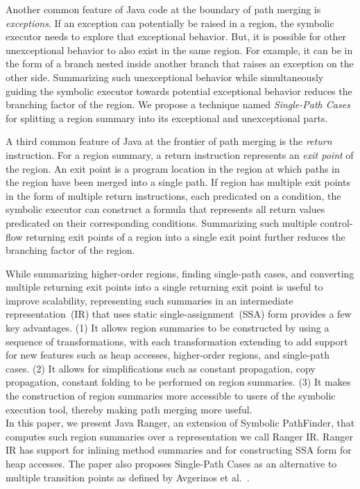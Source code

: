 Another common feature of Java code at the boundary of path merging is \textit{exceptions}.
%
If an exception can potentially be raised in a region, the symbolic executor needs to explore that exceptional behavior.
%
But, it is possible for other unexceptional behavior to also exist in the same region.
%
For example, it can be in the form of a branch nested inside another branch that raises an exception on the other side.
%
Summarizing such unexceptional behavior while simultaneously guiding the symbolic executor towards potential exceptional
behavior reduces the branching factor of the region.
%
We propose a technique named \textit{Single-Path Cases} for splitting a region summary into its exceptional and
unexceptional parts.

A third common feature of Java at the frontier of path merging is the \textit{return} instruction.
%
For a region summary, a return instruction represents an \textit{exit point} of the region.
%
An exit point is a program location in the region at which paths in the region have been merged into a single path.
%
If region has multiple exit points in the form of multiple return instructions, each predicated on a condition, the symbolic
executor can construct a formula that represents all return values predicated on their corresponding conditions.
%
Summarizing such multiple control-flow returning exit points of a region into a single exit point further
reduces the branching factor of the region.

While summarizing higher-order regions, finding single-path cases, and converting multiple returning exit points into a
single returning exit point is useful to improve scalability, representing such summaries in an intermediate
representation~(IR) that uses static single-assignment~(SSA) form provides a few key advantages.
%
(1) It allows region summaries to be constructed by using a sequence of transformations, with each transformation
extending to add support for new features such as heap accesses, higher-order regions, and single-path cases.
%
(2) It allows for simplifications such as constant propagation, copy propagation, constant folding to be performed on
region summaries.
%
(3) It makes the construction of region summaries more accessible to users of the symbolic execution tool, thereby making
path merging more useful.\\
%
In this paper, we present Java Ranger, an extension of Symbolic PathFinder, that computes such region summaries over a representation we call
Ranger IR.
%
Ranger IR has support for inlining method summaries and for constructing SSA form for heap accesses.
%
The paper also proposes Single-Path Cases as an alternative to multiple transition points as
defined by Avgerinos et al.~\cite{veritesting}.


